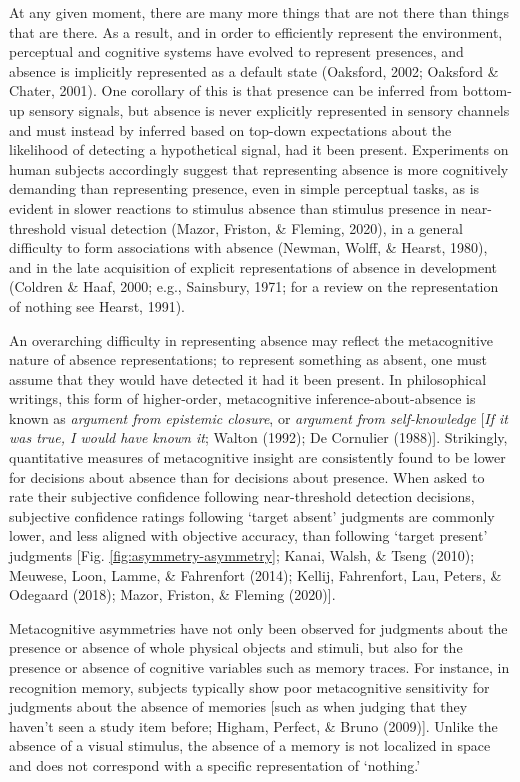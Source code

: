 \documentclass[12pt,twoside]{reedthesis}
\begin{document}
At any given moment, there are many more things that are not there than things that are there. As a result, and in order to efficiently represent the environment, perceptual and cognitive systems have evolved to represent presences, and absence is implicitly represented as a default state (Oaksford, 2002; Oaksford \& Chater, 2001). One corollary of this is that presence can be inferred from bottom-up sensory signals, but absence is never explicitly represented in sensory channels and must instead by inferred based on top-down expectations about the likelihood of detecting a hypothetical signal, had it been present. Experiments on human subjects accordingly suggest that representing absence is more cognitively demanding than representing presence, even in simple perceptual tasks, as is evident in slower reactions to stimulus absence than stimulus presence in near-threshold visual detection (Mazor, Friston, \& Fleming, 2020), in a general difficulty to form associations with absence (Newman, Wolff, \& Hearst, 1980), and in the late acquisition of explicit representations of absence in development (Coldren \& Haaf, 2000; e.g., Sainsbury, 1971; for a review on the representation of nothing see Hearst, 1991).

An overarching difficulty in representing absence may reflect the metacognitive nature of absence representations; to represent something as absent, one must assume that they would have detected it had it been present. In philosophical writings, this form of higher-order, metacognitive inference-about-absence is known as \emph{argument from epistemic closure}, or \emph{argument from self-knowledge} {[}\emph{If it was true, I would have known it}; Walton (1992); De Cornulier (1988){]}. Strikingly, quantitative measures of metacognitive insight are consistently found to be lower for decisions about absence than for decisions about presence. When asked to rate their subjective confidence following near-threshold detection decisions, subjective confidence ratings following `target absent' judgments are commonly lower, and less aligned with objective accuracy, than following `target present' judgments {[}Fig. \ref{fig:asymmetry-asymmetry}; Kanai, Walsh, \& Tseng (2010); Meuwese, Loon, Lamme, \& Fahrenfort (2014); Kellij, Fahrenfort, Lau, Peters, \& Odegaard (2018); Mazor, Friston, \& Fleming (2020){]}.

Metacognitive asymmetries have not only been observed for judgments about the presence or absence of whole physical objects and stimuli, but also for the presence or absence of cognitive variables such as memory traces. For instance, in recognition memory, subjects typically show poor metacognitive sensitivity for judgments about the absence of memories {[}such as when judging that they haven't seen a study item before; Higham, Perfect, \& Bruno (2009){]}. Unlike the absence of a visual stimulus, the absence of a memory is not localized in space and does not correspond with a specific representation of `nothing.'
\end{document}
